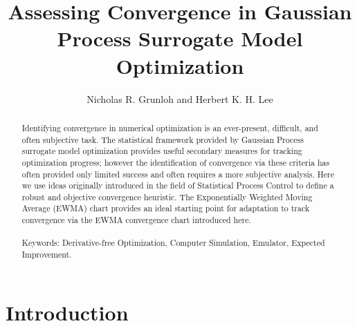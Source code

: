 \documentclass[12pt]{article}
\begin{document}
% 
%
\title{Assessing Convergence in Gaussian Process Surrogate Model Optimization}
\author{Nicholas R. Grunloh and Herbert K. H. Lee}
\date{}
\maketitle
%
%

%
\begin{abstract}
Identifying convergence in numerical optimization is an ever-present, difficult, and often subjective task. 
The statistical framework provided by Gaussian Process surrogate model optimization provides useful secondary measures for tracking optimization progress; however the identification of convergence via these criteria has often provided only limited success and often requires a more subjective analysis. %
Here we use ideas originally introduced in the field of Statistical Process Control to define a robust and objective convergence heuristic. 
The Exponentially Weighted Moving Average (EWMA) chart provides an ideal starting point for adaptation to track convergence via the EWMA convergence chart introduced here.
\\\\
Keywords: Derivative-free Optimization, Computer Simulation, Emulator, Expected Improvement.
\end{abstract}
 
\doublespacing
%
%

%
%
\section{Introduction}
%
%
\end{document}
